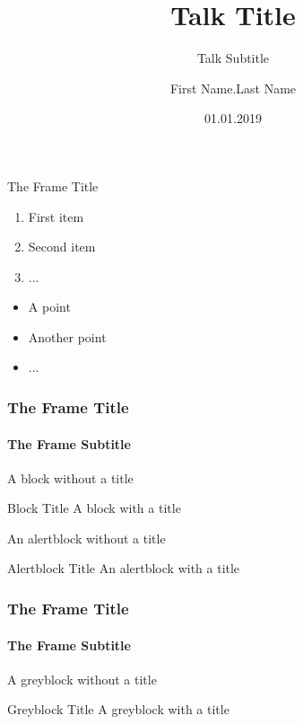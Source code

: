 \documentclass[14pt]{beamer}
\title[Small Title]{Talk Title}
\subtitle{Talk Subtitle}
\author{First Name.Last Name}
\date{01.01.2019}
\begin{document}
\begin{frame}[plain]
  \maketitle
\end{frame}

\begin{frame}{The Frame Title}

  \begin{enumerate}
    \item First item
    \item Second item
    \item ...
  \end{enumerate}

  \vfill

  \begin{itemize}
    \item A point
    \item Another point
    \item ...
  \end{itemize}
  
\end{frame}

\begin{frame}
  \frametitle{The Frame Title}
  \framesubtitle{The Frame Subtitle}

  \begin{block}{}
    A block without a title
  \end{block}

  \begin{block}{Block Title}
    A block with a title
  \end{block}
  
  \begin{alertblock}{}
    An alertblock without a title
  \end{alertblock}

  \begin{alertblock}{Alertblock Title}
    An alertblock with a title
  \end{alertblock}

\end{frame}

\begin{frame}
  \frametitle{The Frame Title}
  \framesubtitle{The Frame Subtitle}

  \begin{greyblock}{}
    A greyblock without a title
  \end{greyblock}

  \vfill

  \begin{greyblock}{Greyblock Title}
    A greyblock with a title
  \end{greyblock}

\end{frame}
\end{document}
